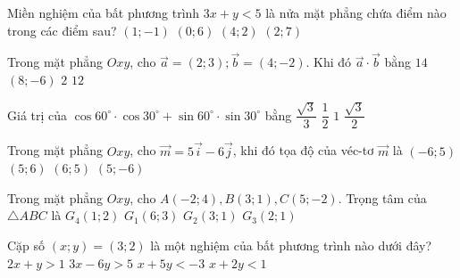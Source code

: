 \begin{ex}%
 Miền nghiệm của bất phương trình $3x+y<5$ là nửa mặt phẳng chứa điểm nào trong các điểm sau?
	\choice
	{\True $(1;-1)$}
	{$(0; 6)$}
	{$(4; 2)$}
	{ $(2; 7)$}
\end{ex}
\begin{ex}%
	Trong mặt phẳng $Oxy$, cho $\overrightarrow{a}=(2; 3); \overrightarrow{b}=(4;-2)$. Khi đó $\overrightarrow{a} \cdot \overrightarrow{b}$ bằng
	\choice
	{$14$}
	{$(8;-6)$}
	{\True $2$}
	{$12$}
\end{ex}
\begin{ex}%
 Giá trị của $\cos 60^\circ \cdot \cos 30^\circ+\sin 60^\circ \cdot \sin 30^\circ$ bằng
	\choice
	{$\dfrac{\sqrt{3}}{3}$}
	{$\dfrac{1}{2}$}
	{$1$}
	{\True $\dfrac{\sqrt{3}}{2}$}
\end{ex}
\begin{ex}%
Trong mặt phẳng $Oxy$, cho $\overrightarrow{m}=5 \overrightarrow{i}-6 \overrightarrow{j}$, khi đó tọa độ của véc-tơ $\overrightarrow{m}$ là
	\choice
	{$(-6; 5)$}
	{$(5; 6)$}
	{$(6; 5)$}
	{\True $(5;-6)$}
\end{ex}
\begin{ex}%
Trong mặt phẳng $Oxy$, cho $A(-2; 4), B(3; 1), C(5;-2)$. Trọng tâm của $\triangle ABC$ là
	\choice
	{$G_4(1; 2)$}
	{$G_1(6; 3)$}
	{$G_2(3; 1)$}
	{\True $G_3(2; 1)$}
\end{ex}
\begin{ex}%
Cặp số $(x; y)=(3; 2)$ là một nghiệm của bất phương trình nào dưới đây?
	\choice
	{\True $2x+y>1$}
	{$3x-6y>5$}
	{$x+5y<-3$}
	{$x+2y<1$}
\end{ex}
